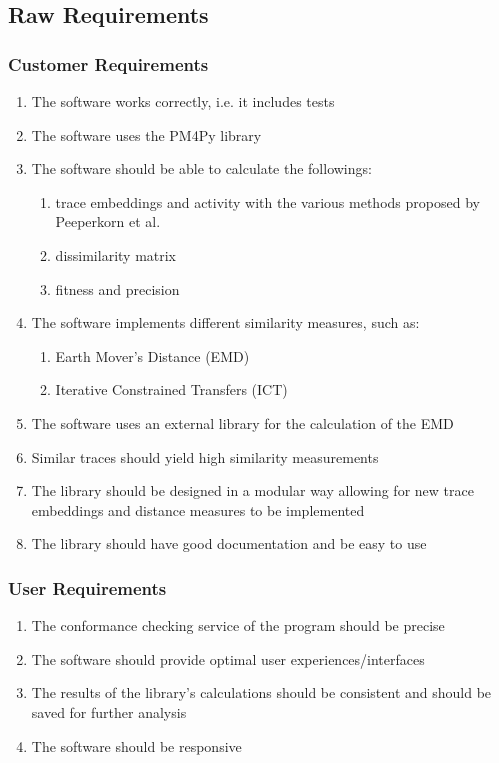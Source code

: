 \documentclass{article}
\begin{document}
\subsection{Raw Requirements}

\subsubsection{Customer Requirements}
\begin{enumerate}
    \item The software works correctly, i.e. it includes tests
    \item The software uses the PM4Py library
    \item The software should be able to calculate the followings:
    \begin{enumerate}
        \item trace embeddings and activity with the various methods proposed by Peeperkorn et al.\cite{inbook}
        \item dissimilarity matrix
        \item fitness and precision 
    \end{enumerate}
    \item The software implements different similarity measures, such as:
    \begin{enumerate}
        \item Earth Mover's Distance (EMD)
        \item Iterative Constrained Transfers (ICT)
    \end{enumerate}
    \item The software uses an external library for the calculation of the EMD
    \item Similar traces should yield high similarity measurements
    \item The library should be designed in a modular way allowing for new trace embeddings and distance measures to be implemented
    \item The library should have good documentation and be easy to use
\end{enumerate}

\subsubsection{User Requirements}
\begin{enumerate}
    \item The conformance checking service of the program should be precise
    \item The software should provide optimal user experiences/interfaces
    \item The results of the library's calculations should be consistent and should be saved for further analysis
    \item The software should be responsive 
\end{enumerate}
\end{document}
